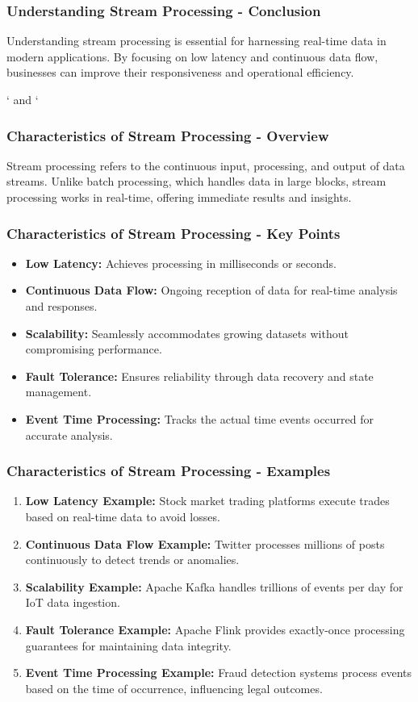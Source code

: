 \documentclass{beamer}
\begin{document}
\begin{frame}[fragile]
    \frametitle{Understanding Stream Processing - Conclusion}
    Understanding stream processing is essential for harnessing real-time data in modern applications. By focusing on low latency and continuous data flow, businesses can improve their responsiveness and operational efficiency.
\end{frame}

\begin{frame}[fragile]` and `\end{frame}

\begin{frame}[fragile]
    \frametitle{Characteristics of Stream Processing - Overview}
    Stream processing refers to the continuous input, processing, and output of data streams. Unlike batch processing, which handles data in large blocks, stream processing works in real-time, offering immediate results and insights.
\end{frame}

\begin{frame}[fragile]
    \frametitle{Characteristics of Stream Processing - Key Points}
    \begin{itemize}
        \item \textbf{Low Latency:} Achieves processing in milliseconds or seconds.
        \item \textbf{Continuous Data Flow:} Ongoing reception of data for real-time analysis and responses.
        \item \textbf{Scalability:} Seamlessly accommodates growing datasets without compromising performance.
        \item \textbf{Fault Tolerance:} Ensures reliability through data recovery and state management.
        \item \textbf{Event Time Processing:} Tracks the actual time events occurred for accurate analysis.
    \end{itemize}
\end{frame}

\begin{frame}[fragile]
    \frametitle{Characteristics of Stream Processing - Examples}
    \begin{enumerate}
        \item \textbf{Low Latency Example:} Stock market trading platforms execute trades based on real-time data to avoid losses.
        \item \textbf{Continuous Data Flow Example:} Twitter processes millions of posts continuously to detect trends or anomalies.
        \item \textbf{Scalability Example:} Apache Kafka handles trillions of events per day for IoT data ingestion.
        \item \textbf{Fault Tolerance Example:} Apache Flink provides exactly-once processing guarantees for maintaining data integrity.
        \item \textbf{Event Time Processing Example:} Fraud detection systems process events based on the time of occurrence, influencing legal outcomes.
    \end{enumerate}
\end{frame}
\end{document}
